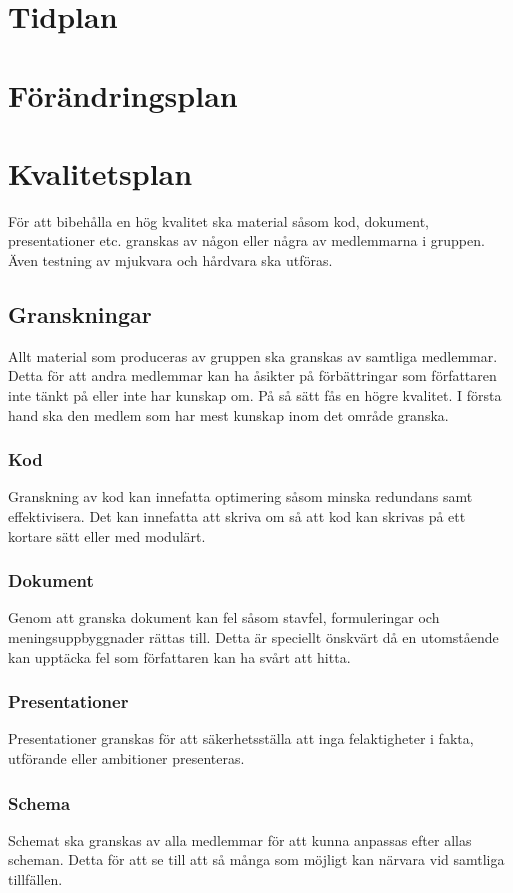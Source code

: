 \documentclass[projektplan/plan.tex]{subfiles}
\begin{document}
\section{Tidplan}

\section{Förändringsplan}

\section{Kvalitetsplan}
För att bibehålla en hög kvalitet ska material såsom kod, dokument,
presentationer etc. granskas av någon eller några av medlemmarna i gruppen.
Även testning av mjukvara och hårdvara ska utföras.

\subsection{Granskningar}
Allt material som produceras av gruppen ska granskas av samtliga medlemmar.
Detta för att andra medlemmar kan ha åsikter på förbättringar som författaren
inte tänkt på eller inte har kunskap om. På så sätt fås en högre kvalitet. I
första hand ska den medlem som har mest kunskap inom det område granska.

\subsubsection{Kod}	
Granskning av kod kan innefatta optimering såsom minska redundans samt
effektivisera. Det kan innefatta att skriva om så att kod kan skrivas på ett
kortare sätt eller med modulärt.

\subsubsection{Dokument}	
Genom att granska dokument kan fel såsom stavfel, formuleringar och
meningsuppbyggnader rättas till. Detta är speciellt önskvärt då en utomstående
kan upptäcka fel som författaren kan ha svårt att hitta.

\subsubsection{Presentationer}	
Presentationer granskas för att säkerhetsställa att inga felaktigheter i fakta,
utförande eller ambitioner presenteras.

\subsubsection{Schema}	
Schemat ska granskas av alla medlemmar för att kunna anpassas efter allas
scheman. Detta för att se till att så många som möjligt kan närvara vid
samtliga tillfällen. 
\end{document}
